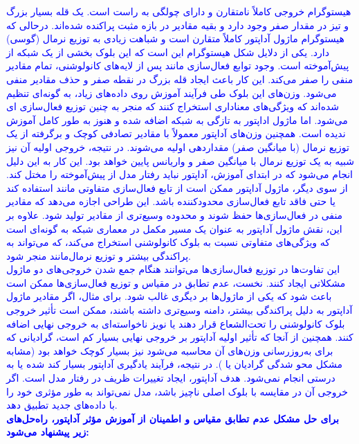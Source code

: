 \documentclass[12pt]{article}
\begin{document}
\begin{enumerate}
\begin{enumerate}
        \textcolor{blue}{
        هیستوگرام خروجی  کاملاً نامتقارن و دارای چولگی به راست است. یک قله بسیار بزرگ و تیز در مقدار صفر وجود دارد و بقیه مقادیر در بازه مثبت پراکنده شده‌اند. درحالی که هیستوگرام ماژول آداپتور کاملاً متقارن است و شباهت زیادی به توزیع نرمال (گوسی) دارد. یکی از دلایل شکل هیستوگرام  این است که این بلوک بخشی از یک شبکه از پیش‌آموخته است. وجود توابع فعال‌سازی مانند  پس از لایه‌های کانولوشنی، تمام مقادیر منفی را صفر می‌کند. این کار باعث ایجاد قله بزرگ در نقطه صفر و حذف مقادیر منفی می‌شود. وزن‌های این بلوک طی فرآیند آموزش روی داده‌های زیاد، به گونه‌ای تنظیم شده‌اند که ویژگی‌های معناداری استخراج کنند که منجر به چنین توزیع فعا‌ل‌سازی  ای می‌شود. اما ماژول اداپتور به تازگی به شبکه اضافه شده و هنوز به طور کامل آموزش ندیده است. همچنین وزن‌های آداپتور معمولاً با مقادیر تصادفی کوچک و برگرفته از یک توزیع نرمال (با میانگین صفر) مقداردهی اولیه می‌شوند. در نتیجه، خروجی اولیه آن نیز شبیه به یک توزیع نرمال با میانگین صفر و واریانس پایین خواهد بود. این کار به این دلیل انجام می‌شود که در ابتدای آموزش، آداپتور نباید رفتار مدل از پیش‌آموخته را مختل کند. از سوی دیگر، ماژول آداپتور ممکن است از تابع فعال‌سازی متفاوتی مانند  استفاده کند یا حتی فاقد تابع فعال‌سازی محدودکننده باشد. این طراحی اجازه می‌دهد که مقادیر منفی در فعال‌سازی‌ها حفظ شوند و محدوده وسیع‌تری از مقادیر تولید شود. علاوه بر این، نقش ماژول آداپتور به عنوان یک مسیر مکمل در معماری شبکه به گونه‌ای است که ویژگی‌های متفاوتی نسبت به بلوک کانولوشنی استخراج می‌کند، که می‌تواند به پراکندگی بیشتر و توزیع نرمال‌مانند منجر شود.\\
        این تفاوت‌ها در توزیع فعال‌سازی‌ها می‌توانند هنگام جمع شدن خروجی‌های دو ماژول مشکلاتی ایجاد کنند. نخست، عدم تطابق در مقیاس و توزیع فعال‌سازی‌ها ممکن است باعث شود که یکی از ماژول‌ها بر دیگری غالب شود. برای مثال، اگر مقادیر ماژول آداپتور به دلیل پراکندگی بیشتر، دامنه وسیع‌تری داشته باشند، ممکن است تأثیر خروجی بلوک کانولوشنی را تحت‌الشعاع قرار دهند یا نویز ناخواسته‌ای به خروجی نهایی اضافه کنند. همچنین از آنجا که تأثیر اولیه آداپتور بر خروجی نهایی بسیار کم است، گرادیانی که برای به‌روزرسانی وزن‌های آن محاسبه می‌شود نیز بسیار کوچک خواهد بود (مشابه مشکل محو شدگی گرادیان یا ). در نتیجه، فرآیند یادگیری آداپتور بسیار کند شده یا به درستی انجام نمی‌شود. هدف آداپتور، ایجاد تغییرات ظریف در رفتار مدل است. اگر خروجی آن در مقایسه با بلوک اصلی ناچیز باشد، مدل نمی‌تواند به طور مؤثری خود را با داده‌های جدید تطبیق دهد.\\
        \textbf{برای حل مشکل عدم تطابق مقیاس و اطمینان از آموزش مؤثر آداپتور، راه‌حل‌های زیر پیشنهاد می‌شود:}
}
\end{enumerate}
\end{enumerate}
\end{document}
